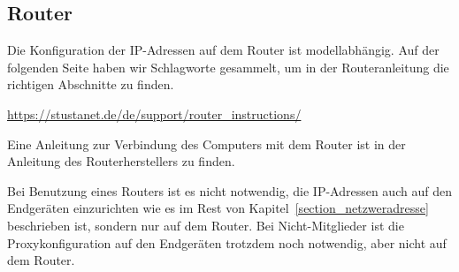 \documentclass[a4paper,12pt]{scrartcl}
\begin{document}
\subsection{Router}
Die Konfiguration der IP-Adressen auf dem Router ist modellabhängig.
Auf der folgenden Seite haben wir Schlagworte gesammelt, um in der Routeranleitung die richtigen Abschnitte zu finden.

\url{https://stustanet.de/de/support/router_instructions/}

Eine Anleitung zur Verbindung des Computers mit dem Router ist in der Anleitung des Routerherstellers zu finden.

Bei Benutzung eines Routers ist es nicht notwendig, die IP-Adressen auch auf den Endgeräten einzurichten wie es im Rest von Kapitel~\ref{section_netzweradresse} beschrieben ist, sondern nur auf dem Router.
Bei Nicht-Mitglieder ist die Proxykonfiguration auf den Endgeräten trotzdem noch notwendig, aber nicht auf dem Router.
\end{document}
